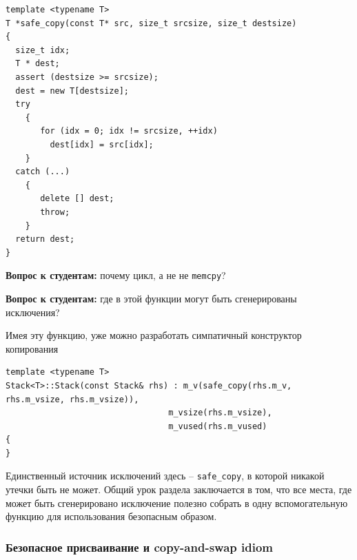 \documentclass[a4paper,12pt,oneside]{article}
\newif\ifanswers
\begin{document}
\begin{lstlisting}
template <typename T>
T *safe_copy(const T* src, size_t srcsize, size_t destsize)
{
  size_t idx;
  T * dest;
  assert (destsize >= srcsize);
  dest = new T[destsize];
  try 
    {
       for (idx = 0; idx != srcsize, ++idx)
         dest[idx] = src[idx];
    }
  catch (...)
    {
       delete [] dest;
       throw;
    }
  return dest;
}
\end{lstlisting}

\textbf{Вопрос к студентам:} почему цикл, а не не \lstinline!memcpy!?

\ifanswers
Правильный ответ: потому что должны быть вызваны операторы присваивания для \lstinline!T!.
\fi

\textbf{Вопрос к студентам:} где в этой функции могут быть сгенерированы исключения?

\ifanswers
Внутри этой функции исключения могут быть сгенерированы:

\begin{itemize}
\item
В функции \lstinline!new!, переопределённым для \lstinline!T! оператором \lstinline!operator new! или конструктором  \lstinline!T! -- в этом случае никакой памяти выделено не будет и утечки не произойдёт, а исключения покинут  \lstinline!safe_copy!
\item
В функции  \lstinline!operator=! или  \lstinline!operator[]! типа  \lstinline!T! при копировании. В этом случае исключения будут перехвачены, ресурсы освобождены и исключения отпущены дальше.
\end{itemize}
\fi

Имея эту функцию, уже можно разработать симпатичный конструктор копирования

\begin{lstlisting}
template <typename T>
Stack<T>::Stack(const Stack& rhs) : m_v(safe_copy(rhs.m_v, rhs.m_vsize, rhs.m_vsize)), 
                                 m_vsize(rhs.m_vsize), 
                                 m_vused(rhs.m_vused) 
{
}
\end{lstlisting}

Единственный источник исключений здесь -- \lstinline!safe_copy!, в которой никакой утечки быть не может. Общий урок раздела заключается в том, что все места, где может быть сгенерировано исключение полезно собрать в одну вспомогательную функцию для использования безопасным образом.

\subsubsection{Безопасное присваивание и copy-and-swap idiom}\label{CopySwap}
\end{document}
